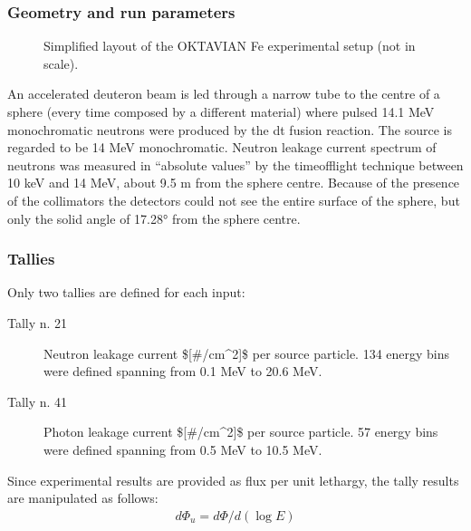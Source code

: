 \documentclass[letterpaper,10pt,english]{sphinxmanual}
\let\sphinxpxdimen\pdfpxdimen\else\newdimen\sphinxpxdimen
\begin{document}
\subsubsection{Geometry and run parameters}
\label{\detokenize{usage/benchmarks:id12}}
\begin{figure}[htbp]
\centering
\capstart

\noindent\sphinxincludegraphics[width=600\sphinxpxdimen]{{oktaviansimplified}.png}
\caption{Simplified layout of the OKTAVIAN Fe experimental setup (not in scale).}\label{\detokenize{usage/benchmarks:id31}}\end{figure}

\sphinxAtStartPar
An accelerated deuteron beam is led through a narrow tube to the centre of a sphere
(every time composed by a different material) where pulsed 14.1 MeV monochromatic
neutrons were produced by the d\sphinxhyphen{}t fusion reaction. The source is regarded to be 14
MeV monochromatic. Neutron leakage current spectrum of neutrons was measured in
“absolute values” by the time\sphinxhyphen{}of\sphinxhyphen{}flight technique between 10 keV and 14 MeV, about
9.5 m from the sphere centre. Because of the presence of the collimators the
detectors could not see the entire surface of the sphere, but only the solid angle
of 17.28° from the sphere centre.


\subsubsection{Tallies}
\label{\detokenize{usage/benchmarks:id13}}
\sphinxAtStartPar
Only two tallies are defined for each input:
\begin{description}
\item[{Tally n. 21}] \leavevmode
\sphinxAtStartPar
Neutron leakage current \${[}\#/cm\textasciicircum{}2{]}\$ per source particle. 134 energy bins were defined spanning from 0.1 MeV to 20.6 MeV.

\item[{Tally n. 41}] \leavevmode
\sphinxAtStartPar
Photon leakage current \${[}\#/cm\textasciicircum{}2{]}\$ per source particle. 57 energy bins were defined spanning from 0.5 MeV to 10.5 MeV.

\end{description}

\sphinxAtStartPar
Since experimental results are provided as flux per unit lethargy, the tally results are manipulated as follows:
\begin{equation*}
\begin{split}d\Phi_u = d\Phi/d(\log{E})\end{split}
\end{equation*}
\end{document}
